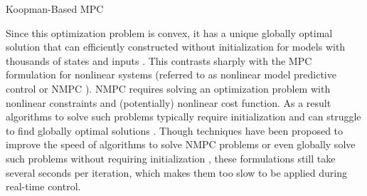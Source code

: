 \begin{algorithm}[t]
\SetAlgoLined
{}
 \caption{Koopman-Based MPC}
 \label{alg:mpc}
\end{algorithm}



Since this optimization problem is convex, it has a unique globally optimal solution that can efficiently constructed without initialization \cite{boyd2004convex} for models with thousands of states and inputs  \cite{paulson2014fast,stellato2018osqp}.
This contrasts sharply with the MPC formulation for nonlinear systems (referred to as nonlinear model predictive control or NMPC \cite{allgower2012nonlinear}).
NMPC requires solving an optimization problem with nonlinear constraints and (potentially) nonlinear cost function.
As a result algorithms to solve such problems typically require initialization and can struggle to find globally optimal solutions \cite{polak2012optimization}.
Though techniques have been proposed to improve the speed of algorithms to solve NMPC problems \cite{patterson2014gpops,hereid2017frost} or even globally solve such problems without requiring initialization \cite{zhao2017control}, these formulations still take several seconds per iteration, which makes them too slow to be applied during real-time control.


